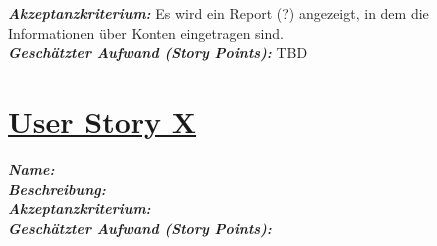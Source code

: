 \documentclass[12pt]{article}%
\newcommand{\comment}[1]{}
\begin{document}
\textbf{\textit{Akzeptanzkriterium:}} Es wird ein Report (?) angezeigt, in dem die Informationen über Konten eingetragen sind.
\\

\textbf{\textit{Geschätzter Aufwand (Story Points):}} TBD
\\





\comment{ 
Reports/Views
- Projektübersicht
- Einzelprojekt
- Pando
- Pando Mitarbeiter
- Übersicht - Budget

Gamification
- Leaderboard
- Leaderboard-Parameter anpassen
- Virtuelles Lob
- Collectible

Weiteres
- Angriffsschutz


}



\section*{\large \underline{User Story X}}
\textit{\textbf{Name:}} 
\\

\textbf{\textit{Beschreibung:}} 
\\

\textbf{\textit{Akzeptanzkriterium:}} 
\\

\textbf{\textit{Geschätzter Aufwand (Story Points):}}
\\
\end{document}
